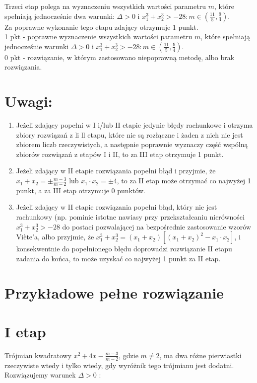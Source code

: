 \documentclass[10pt]{article}
\begin{document}
Trzeci etap polega na wyznaczeniu wszystkich wartości parametru $m$, które spełniają jednocześnie dwa warunki: $\Delta>0$ i $x_{1}^{3}+x_{2}^{3}>-28: m \in\left(\frac{11}{5}, \frac{9}{4}\right)$.\\
Za poprawne wykonanie tego etapu zdający otrzymuje 1 punkt.\\
1 pkt - poprawne wyznaczenie wszystkich wartości parametru $m$, które spełniają jednocześnie warunki $\Delta>0$ i $x_{1}^{3}+x_{2}^{3}>-28: m \in\left(\frac{11}{5}, \frac{9}{4}\right)$.\\
0 pkt - rozwiązanie, w którym zastosowano niepoprawną metodę, albo brak rozwiązania.

\section*{Uwagi:}
\begin{enumerate}
  \item Jeżeli zdający popełni w I i/lub II etapie jedynie błędy rachunkowe i otrzyma zbiory rozwiązań z li ll etapu, które nie są rozłączne i żaden z nich nie jest zbiorem liczb rzeczywistych, a następnie poprawnie wyznaczy część wspólną zbiorów rozwiązań z etapów I i II, to za III etap otrzymuje 1 punkt.
  \item Jeżeli zdający w II etapie rozwiązania popełni błąd i przyjmie, że $x_{1}+x_{2}= \pm \frac{m-3}{m-2}$ lub $x_{1} \cdot x_{2}= \pm 4$, to za II etap może otrzymać co najwyżej 1 punkt, a za III etap otrzymuje 0 punktów.
  \item Jeżeli zdający w II etapie rozwiązania popełni błąd, który nie jest rachunkowy (np. pominie istotne nawiasy przy przekształcaniu nierówności $x_{1}^{3}+x_{2}^{3}>-28$ do postaci pozwalającej na bezpośrednie zastosowanie wzorów Viète’a, albo przyjmie, że $x_{1}^{3}+x_{2}^{3}=\left(x_{1}+x_{2}\right)\left[\left(x_{1}+x_{2}\right)^{2}-x_{1} \cdot x_{2}\right]$, i konsekwentnie do popełnionego błędu doprowadzi rozwiązanie II etapu zadania do końca, to może uzyskać co najwyżej 1 punkt za II etap.
\end{enumerate}

\section*{Przykładowe pełne rozwiązanie}
\section*{I etap}
Trójmian kwadratowy $x^{2}+4 x-\frac{m-3}{m-2}$, gdzie $m \neq 2$, ma dwa różne pierwiastki rzeczywiste wtedy i tylko wtedy, gdy wyróżnik tego trójmianu jest dodatni. Rozwiązujemy warunek $\Delta>0$ :
\end{document}
